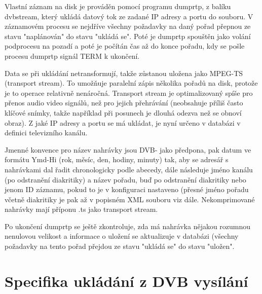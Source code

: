 \vspace{10pt}

Vlastní záznam na disk je prováděn pomocí programu dumprtp, z balíku dvbstream, který ukládá datový tok ze zadané IP adresy a portu do souboru. V záznamovém procesu se nejdříve všechny požadavky na daný pořad přepnou ze stavu "naplánován" do stavu "ukládá se". Poté je dumprtp spouštěn jako volání podprocesu na pozadí a poté je počítán čas až do konce pořadu, kdy se pošle procesu dumprtp signál TERM k ukončení. 

\vspace{10pt}

Data se při ukládání netransformují, takže zůstanou uložena jako MPEG-TS (transport stream). To umožňuje paralelní zápis několika pořadů na disk, protože je to operace relativně nenáročná. Transport stream je optimalizovaný spíše pro přenos audio video signálů, než pro jejich přehrávání (neobsahuje příliš často klíčové snímky, takže například při posunech je dlouhá odezva než se obnoví obraz). Z jaké IP adresy a portu se má ukládat, je nyní určeno v databázi v definici televizního kanálu.

\vspace{10pt}

Jmenné konvence pro název nahrávky jsou DVB- jako předpona, pak datum ve formátu Ymd-Hi (rok, měsíc, den, hodiny, minuty) tak, aby se adresář s nahrávkami dal řadit chronologicky podle abecedy, dále následuje jméno kanálu (po odstranění diakritiky) a název pořadu, buď po odstranění diakritiky nebo jenom ID záznamu, pokud to je v konfiguraci nastaveno (přesné jméno pořadu včetně diakritiky je pak až v popisném XML souboru viz dále. Nekomprimované nahrávky mají příponu .ts jako transport stream.

\vspace{10pt}

Po ukončení dumprtp se ještě zkontroluje, zda má nahrávka nějakou rozumnou nenulovou velikost a informace o uložení se aktualizuje v databázi (všechny požadavky na tento pořad přejdou ze stavu "ukládá se" do stavu "uložen".

\vspace{10pt}

\section{Specifika ukládání z DVB vysílání}

\vspace{10pt}

